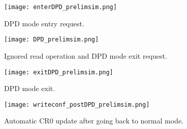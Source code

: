 \documentclass[10pt, english, a4paper, titlepage, oneside]{book}
\begin{document}
\vspace{4mm}
\begin{figure}[H]
    \centering
    \captionsetup{width=18cm}
    \texttt{[image: enterDPD\_prelimsim.png]}
    \caption{\centering DPD mode entry request.}
    \label{enterDPD_prelimsim}
\end{figure}
\begin{figure}[H]
    \centering
    \captionsetup{width=18cm}
    \texttt{[image: DPD\_prelimsim.png]}
    \caption{\centering Ignored read operation and DPD mode exit request.}
    \label{DPD_prelimsim}
\end{figure}
\begin{figure}[H]
    \centering
    \captionsetup{width=18cm}
    \texttt{[image: exitDPD\_prelimsim.png]}
    \caption{\centering DPD mode exit.}
    \label{exitDPD_prelimsim}
\end{figure}
\begin{figure}[H]
    \centering
    \captionsetup{width=18cm}
    \texttt{[image: writeconf\_postDPD\_prelimsim.png]}
    \caption{\centering Automatic CR0 update after going back to normal mode.}
    \label{writeconf_postDPD_prelimsim}
\end{figure}
\vspace{6mm}
\end{document}

